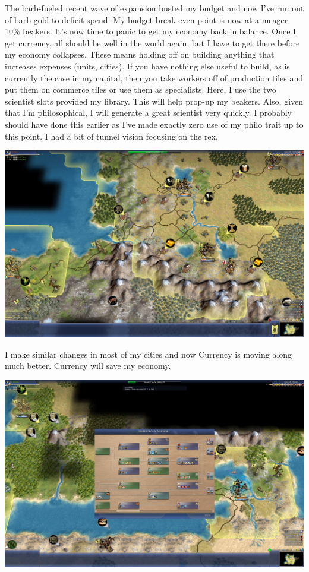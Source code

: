 \documentclass[10pt]{article}
\begin{document}
The barb-fueled recent wave of expansion busted my budget and now I've run out of barb gold to deficit spend. My
budget break-even point is now at a meager 10\% beakers. It's now time to panic to get my economy back in balance. Once
I get currency, all should be well in the world again, but I have to get there before my economy collapses. These means
holding off on building anything that increases expenses (units, cities). If you have nothing else useful to build, as is
currently the case in my capital, then you take workers off of production tiles and put them on commerce tiles or use
them as specialists. Here, I use the two scientist slots provided my library. This will help prop-up my beakers. Also,
given that I'm philosophical, I will generate a great scientist very quickly. I probably should have done this earlier as
I've made exactly zero use of my philo trait up to this point. I had a bit of tunnel vision focusing on the rex.

\includegraphics[width=1.0\textwidth]{116}

I make similar changes in most of my cities and now Currency is moving along much better. Currency will save my
economy.

\includegraphics[width=1.0\textwidth]{117}
\end{document}
